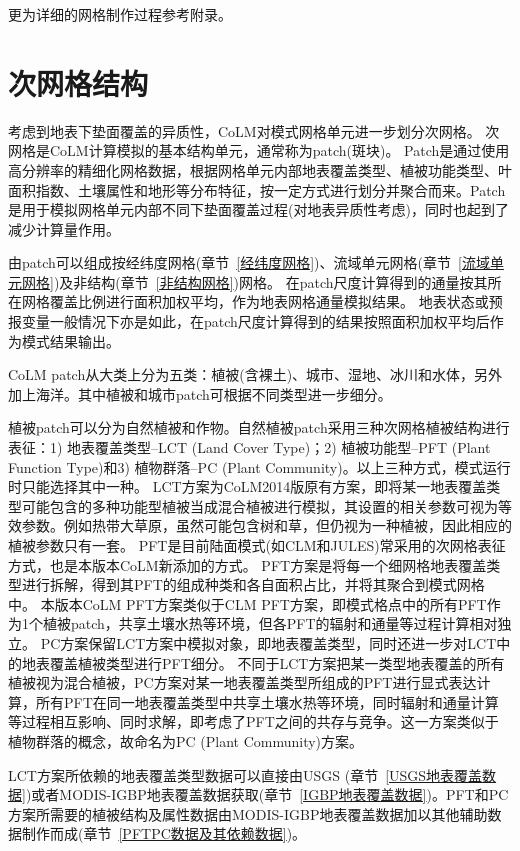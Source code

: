 更为详细的网格制作过程参考附录。


\section{次网格结构}\label{次网格}

考虑到地表下垫面覆盖的异质性，CoLM对模式网格单元进一步划分次网格。
次网格是CoLM计算模拟的基本结构单元，通常称为patch(斑块)。
Patch是通过使用高分辨率的精细化网格数据，根据网格单元内部地表覆盖类型、植被功能类型、叶面积指数、土壤属性和地形等分布特征，按一定方式进行划分并聚合而来。Patch是用于模拟网格单元内部不同下垫面覆盖过程(对地表异质性考虑)，同时也起到了减少计算量作用。


由patch可以组成按经纬度网格(章节~\ref{经纬度网格})、流域单元网格(章节~\ref{流域单元网格})及非结构(章节~\ref{非结构网格})网格。
在patch尺度计算得到的通量按其所在网格覆盖比例进行面积加权平均，作为地表网格通量模拟结果。
地表状态或预报变量一般情况下亦是如此，在patch尺度计算得到的结果按照面积加权平均后作为模式结果输出。


CoLM patch从大类上分为五类：植被(含裸土)、城市、湿地、冰川和水体，另外加上海洋。其中植被和城市patch可根据不同类型进一步细分。


植被patch可以分为自然植被和作物。自然植被patch采用三种次网格植被结构进行表征：1) 地表覆盖类型--LCT (Land Cover Type)；2) 植被功能型--PFT (Plant Function Type)和3) 植物群落--PC (Plant Community)。以上三种方式，模式运行时只能选择其中一种。
LCT方案为CoLM2014版原有方案，即将某一地表覆盖类型可能包含的多种功能型植被当成混合植被进行模拟，其设置的相关参数可视为等效参数。例如热带大草原，虽然可能包含树和草，但仍视为一种植被，因此相应的植被参数只有一套。
PFT是目前陆面模式(如CLM和JULES)常采用的次网格表征方式，也是本版本CoLM新添加的方式。
PFT方案是将每一个细网格地表覆盖类型进行拆解，得到其PFT的组成种类和各自面积占比，并将其聚合到模式网格中。
本版本CoLM PFT方案类似于CLM PFT方案，即模式格点中的所有PFT作为1个植被patch，共享土壤水热等环境，但各PFT的辐射和通量等过程计算相对独立。
PC方案保留LCT方案中模拟对象，即地表覆盖类型，同时还进一步对LCT中的地表覆盖植被类型进行PFT细分。
不同于LCT方案把某一类型地表覆盖的所有植被视为混合植被，PC方案对某一地表覆盖类型所组成的PFT进行显式表达计算，所有PFT在同一地表覆盖类型中共享土壤水热等环境，同时辐射和通量计算等过程相互影响、同时求解，即考虑了PFT之间的共存与竞争。这一方案类似于植物群落的概念，故命名为PC (Plant Community)方案。


LCT方案所依赖的地表覆盖类型数据可以直接由USGS (章节~\ref{USGS地表覆盖数据})或者MODIS-IGBP地表覆盖数据获取(章节~\ref{IGBP地表覆盖数据})。PFT和PC方案所需要的植被结构及属性数据由MODIS-IGBP地表覆盖数据加以其他辅助数据制作而成(章节~\ref{PFTPC数据及其依赖数据})。


